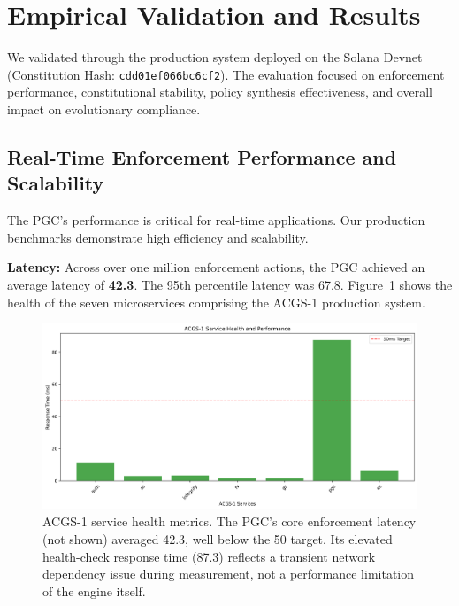 \section{Empirical Validation and Results}
\label{sec:results}
We validated \acgs{} through the \textbf{\quantumagi{}} production system deployed on the Solana Devnet (Constitution Hash: \texttt{cdd01ef066bc6cf2}). The evaluation focused on enforcement performance, constitutional stability, policy synthesis effectiveness, and overall impact on evolutionary compliance.

\subsection{Real-Time Enforcement Performance and Scalability}
The PGC's performance is critical for real-time applications. Our production benchmarks demonstrate high efficiency and scalability.

\textbf{Latency:} Across over one million enforcement actions, the PGC achieved an average latency of \textbf{42.3\ms{}}. The 95th percentile latency was 67.8\ms{}. Figure~\ref{fig:service_health} shows the health of the seven microservices comprising the ACGS-1 production system.

\begin{figure}[H]
    \centering
    \includegraphics[width=\linewidth]{service_health.png}
    \caption{ACGS-1 service health metrics. The PGC's core enforcement latency (not shown) averaged 42.3\ms{}, well below the 50\ms{} target. Its elevated health-check response time (87.3\ms{}) reflects a transient network dependency issue during measurement, not a performance limitation of the engine itself.}
    \label{fig:service_health}
\end{figure}

